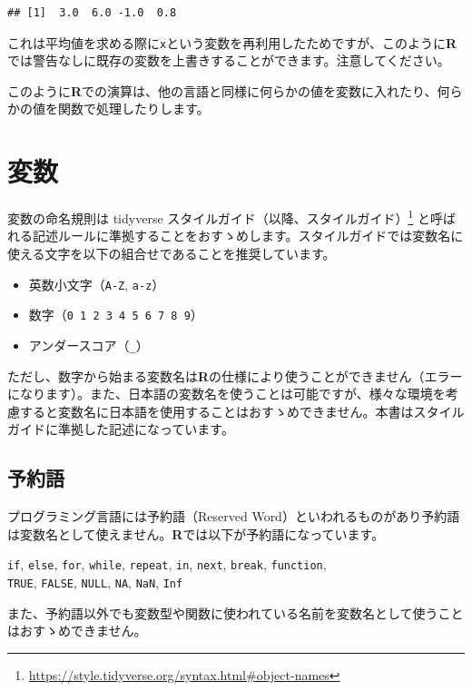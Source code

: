 \documentclass[
  12pt,
]{book}
\DeclareRobustCommand{\href}[2]{#2\footnote{\url{#1}}}
\providecommand{\tightlist}{%
  \setlength{\itemsep}{0pt}\setlength{\parskip}{0pt}}
\begin{document}
\begin{verbatim}
## [1]  3.0  6.0 -1.0  0.8
\end{verbatim}

これは平均値を求める際に\texttt{x}という変数を再利用したためですが、このように\textbf{R}では警告なしに既存の変数を上書きすることができます。注意してください。

このように\textbf{R}での演算は、他の言語と同様に何らかの値を変数に入れたり、何らかの値を関数で処理したりします。

\hypertarget{ux5909ux6570}{%
\section{変数}\label{ux5909ux6570}}

変数の命名規則は \href{https://style.tidyverse.org/syntax.html\#object-names}{tidyverse スタイルガイド（以降、スタイルガイド）} と呼ばれる記述ルールに準拠することをおすゝめします。スタイルガイドでは変数名に使える文字を以下の組合せであることを推奨しています。

\begin{itemize}
\tightlist
\item
  英数小文字（\texttt{A-Z}, \texttt{a-z}）
\item
  数字（\texttt{0\ 1\ 2\ 3\ 4\ 5\ 6\ 7\ 8\ 9}）
\item
  アンダースコア（\texttt{\_}）
\end{itemize}

ただし、数字から始まる変数名は\textbf{R}の仕様により使うことができません（エラーになります）。また、日本語の変数名を使うことは可能ですが、様々な環境を考慮すると変数名に日本語を使用することはおすゝめできません。本書はスタイルガイドに準拠した記述になっています。

\hypertarget{ux4e88ux7d04ux8a9e}{%
\subsection{予約語}\label{ux4e88ux7d04ux8a9e}}

プログラミング言語には予約語（Reserved Word）といわれるものがあり予約語は変数名として使えません。\textbf{R}では以下が予約語になっています。

\texttt{if}, \texttt{else}, \texttt{for}, \texttt{while}, \texttt{repeat}, \texttt{in}, \texttt{next}, \texttt{break}, \texttt{function},\\
\texttt{TRUE}, \texttt{FALSE}, \texttt{NULL}, \texttt{NA}, \texttt{NaN}, \texttt{Inf}

また、予約語以外でも変数型や関数に使われている名前を変数名として使うことはおすゝめできません。
\end{document}
